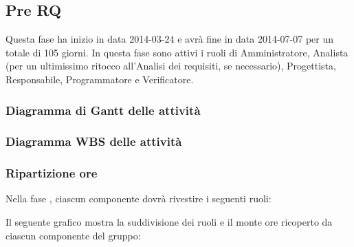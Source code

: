 \subsection{Pre RQ}
Questa fase ha inizio in data 2014-03-24 e avrà fine in data 2014-07-07 per un totale di 105 giorni. In questa fase sono attivi i ruoli di Amministratore, Analista (per un ultimissimo ritocco all'Analisi dei requisiti, se necessario), Progettista, Responsabile, Programmatore e Verificatore.

\subsubsection{Diagramma di Gantt delle attività}

\newpage
\subsubsection{Diagramma WBS delle attività}

\newpage
\subsubsection{Ripartizione ore}

\newpage
Nella fase , ciascun componente dovrà rivestire i seguenti ruoli:

Il seguente grafico mostra la suddivisione dei ruoli e il monte ore ricoperto da ciascun componente del gruppo:
